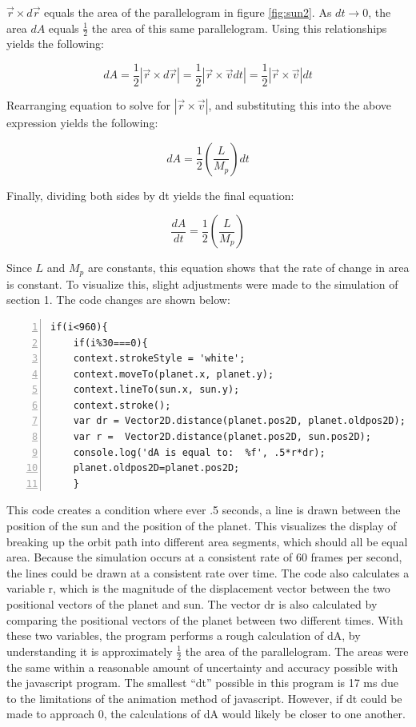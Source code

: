 $\vec{r} \times d\vec{r}$ equals the area of the parallelogram in figure \ref{fig:sun2}.  As $dt \rightarrow  0$, the area $dA$ equals $\frac{1}{2}$ the area of this same parallelogram.  Using this relationships yields the following:

$$ dA = \frac{1}{2}|\vec{r} \times d\vec{r}| = \frac{1}{2}\left|\vec{r} \times \vec{v} dt \right| = \frac{1}{2}\left|\vec{r} \times \vec{v}\right| dt  $$

Rearranging equation  to solve for $\left|\vec{r} \times \vec{v}\right|$, and substituting this into the above expression yields the following:

$$ dA = \frac{1}{2}\left(\frac{L}{M_p}\right)dt  $$

Finally, dividing both sides by dt yields the final equation:

\begin{equation}\label{dadt}
\frac{dA}{dt} = \frac{1}{2}\left(\frac{L}{M_p}\right)
\end{equation}

Since $L$ and $M_p$ are constants, this equation shows that the rate of change in area is constant.  To visualize this, slight adjustments were made to the simulation of section 1.  The code changes are shown below:



\begin{lstlisting}[breaklines=true, frame=single, numbers=left, caption=Code for printing out values of speed, label=lst:changestoorbit]
if(i<960){
	if(i%30===0){
	context.strokeStyle = 'white';
	context.moveTo(planet.x, planet.y);
	context.lineTo(sun.x, sun.y);
	context.stroke();
	var dr = Vector2D.distance(planet.pos2D, planet.oldpos2D);
	var r =  Vector2D.distance(planet.pos2D, sun.pos2D);
	console.log('dA is equal to:  %f', .5*r*dr);
	planet.oldpos2D=planet.pos2D;
	}
\end{lstlisting}

This code creates a condition where ever .5 seconds, a line is drawn between the position of the sun and the position of the planet.  This visualizes the display of breaking up the orbit path into different area segments, which should all be equal area.  Because the simulation occurs at a consistent rate of 60 frames per second, the lines could be drawn at a consistent rate over time.  The code also calculates a variable r, which is the magnitude of the displacement vector between the two positional vectors of the planet and sun.  The vector dr is also calculated by comparing the positional vectors of the planet between two different times.  With these two variables, the program performs a rough calculation of dA, by understanding it is approximately $\frac{1}{2}$ the area of the parallelogram.  The areas were the same within a reasonable amount of uncertainty and accuracy possible with the javascript program.  The smallest ``dt'' possible in this program is 17 ms due to the limitations of the animation method of javascript.  However, if dt could be made to approach 0, the calculations of dA would likely be closer to one another.

